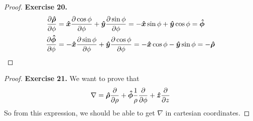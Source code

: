 \documentclass[11pt]{article}
\newcommand{\hatx}{\bm{\hat{x}}}
\newcommand{\haty}{\bm{\hat{y}}}
\newcommand{\hatz}{\bm{\hat{z}}}
\newcommand{\hatrho}{\bm{\hat{\rho}}}
\newcommand{\hatphi}{\bm{\hat{\phi}}}
\theoremstyle{definition}
\begin{document}
\begin{proof}{\textbf{Exercise 20.}}
    \begin{align*}
        \partialderivative{\hatrho}{\phi} &=
        \hatx\partialderivative{\cos\phi}{\phi} + \haty \partialderivative{\sin\phi}{\phi}
        = -\hatx\sin\phi + \haty \cos\phi = \hatphi\\
        \partialderivative{\hatphi}{\phi} &=
        -\hatx\partialderivative{\sin\phi}{\phi}
        + \haty \partialderivative{\cos\phi}{\phi}
        = -\hatx\cos\phi - \haty \sin\phi = -\hatrho
    \end{align*}
\end{proof}
\cleardoublepage
\begin{proof}{\textbf{Exercise 21.}}
    We want to prove that
    $$\nabla = \hatrho \partialderivative{}{\rho}
    + \hatphi \frac{1}{\rho}\partialderivative{}{\phi}
    + \hatz\partialderivative{}{z}$$
    So from this expression, we should be able to get $\nabla$
    in cartesian coordinates.


\end{proof}
\end{document}
